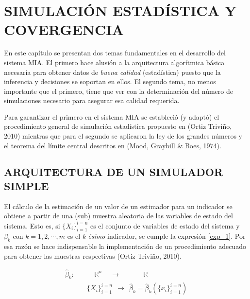 \chapter{SIMULACIÓN ESTADÍSTICA Y COVERGENCIA}

\renewcommand{\theequation}{\arabic{chapter}|\arabic{equation}}
\renewcommand{\thealgorithm}{\arabic{chapter}|\arabic{algorithm}}
\renewcommand{\theexample}{\arabic{chapter}|\arabic{example}}

\algrenewcommand{}
\algrenewcommand{}
\algrenewcommand{}
\algrenewcommand{}

En este capítulo se presentan dos temas fundamentales en el desarrollo del sistema MIA. El primero hace alusión a la arquitectura algorítmica básica necesaria para obtener datos de \emph{buena calidad}  (estadística) puesto que la inferencia y decisiones se soportan en ellos. El segundo tema, no menos importante que el primero, tiene que ver con la determinación del número de simulaciones necesario para asegurar esa calidad requerida.

Para garantizar el primero en el sistema MIA se estableció (y adaptó) el procedimiento general de simulación estadística propuesto en (Ortiz Triviño, 2010) mientras que para el segundo se aplicaron la ley de los grandes números y el teorema del límite central descritos en (Mood, Graybill \& Boes, 1974).

\section{ARQUITECTURA DE UN SIMULADOR SIMPLE}

El cálculo de la estimación de un valor de un estimador para un indicador se obtiene a partir de una (sub) muestra aleatoria de las variables de estado del sistema. Esto es, si $\{ X_i \}_{i=1}^{i=n}$ es el conjunto de variables de estado del sistema y $\beta_k$ con $k=1,2,\cdots,m$ es el \emph{k-ésimo} indicador, se cumple la expresión \ref{exp_1}.  Por esa razón se hace indispensable la implementación de un procedimiento adecuado para obtener las muestras respectivas (Ortiz Triviño, 2010).

\begin{equation} \label{exp_1}
\begin{split}
\hat{\beta}_k: \quad&\ \ \ \ \ \mathbb{R}^n\quad\ \rightarrow\ \ \qquad\ \ \ \ \mathbb{R} \\
\quad&\{ X_i \}_{i=1}^{i=n}\ \ \rightarrow\ \ \hat{\beta}_k = \hat{\beta}_k (\{ x_i \}_{i=1}^{i=n})
\end{split}
\end{equation}

